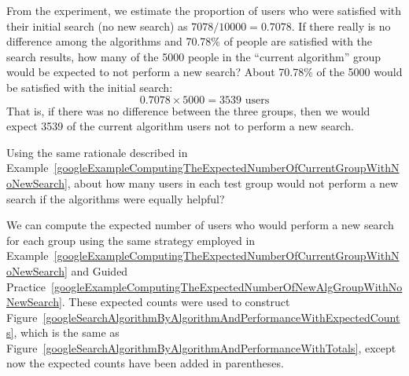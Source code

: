 \begin{examplewrap}
\begin{nexample}{From the experiment, we estimate the proportion of users who were satisfied with their initial search (no new search) as $7078/10000 = 0.7078$. If there really is no difference among the algorithms and 70.78\% of people are satisfied with the search results, how many of the 5000 people in the ``current algorithm'' group would be expected to not perform a new search?} \label{googleExampleComputingTheExpectedNumberOfCurrentGroupWithNoNewSearch}
About 70.78\% of the 5000 would be satisfied with the initial search:
$$ 0.7078\times 5000 = 3539\text{ users} $$
That is, if there was no difference between the three groups, then we would expect 3539 of the current algorithm users not to perform a new search.
\end{nexample}
\end{examplewrap}

\begin{exercisewrap}
\begin{nexercise}\label{googleExampleComputingTheExpectedNumberOfNewAlgGroupWithNoNewSearch}
Using the same rationale described in Example~\ref{googleExampleComputingTheExpectedNumberOfCurrentGroupWithNoNewSearch}, about how many users in each test group would not perform a new search if the algorithms were equally helpful?\footnotemark
\end{nexercise}
\end{exercisewrap}

We can compute the expected number of users who would perform a new search for each group using the same strategy employed in Example~\ref{googleExampleComputingTheExpectedNumberOfCurrentGroupWithNoNewSearch} and Guided Practice~\ref{googleExampleComputingTheExpectedNumberOfNewAlgGroupWithNoNewSearch}. These expected counts were used to construct Figure~\ref{googleSearchAlgorithmByAlgorithmAndPerformanceWithExpectedCounts}, which is the same as Figure~\ref{googleSearchAlgorithmByAlgorithmAndPerformanceWithTotals}, except now the expected counts have been added in parentheses.

